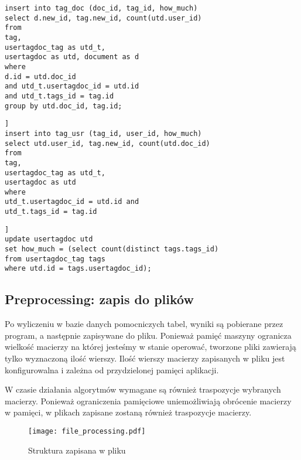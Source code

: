 \lstset{language=SQL}   
\begin{lstlisting}[frame=lines, caption={Skrypt dodający dane do tabeli tag\_doc}, label={sql_tag_doc}]
insert into tag_doc (doc_id, tag_id, how_much) 
select d.new_id, tag.new_id, count(utd.user_id)
from 
tag, 
usertagdoc_tag as utd_t,
usertagdoc as utd, document as d
where
d.id = utd.doc_id 
and utd_t.usertagdoc_id = utd.id 
and utd_t.tags_id = tag.id
group by utd.doc_id, tag.id;

\end{lstlisting}

\begin{lstlisting}[frame=lines, caption={Skrypt dodający dane do tabeli tag\_usr}, label={sql_tag_usr}]]
insert into tag_usr (tag_id, user_id, how_much)
select utd.user_id, tag.new_id, count(utd.doc_id)
from
tag,
usertagdoc_tag as utd_t,
usertagdoc as utd
where
utd_t.usertagdoc_id = utd.id and
utd_t.tags_id = tag.id
\end{lstlisting}

\begin{lstlisting}[frame=lines, caption={Skrypt updatujący pole how\_much w tabeli usertagdoc}, label={sql_usrtagdoc}] ]
update usertagdoc utd
set how_much = (select count(distinct tags.tags_id)
from usertagdoc_tag tags
where utd.id = tags.usertagdoc_id);
\end{lstlisting}


\subsection{Preprocessing: zapis do plików}
Po wyliczeniu w bazie danych pomocniczych tabel, wyniki są pobierane przez program, a następnie zapisywane do pliku. Ponieważ pamięć maszyny ogranicza wielkość macierzy na której jesteśmy w stanie operować, tworzone pliki zawierają tylko wyznaczoną ilość wierszy. Ilość wierszy macierzy zapisanych w pliku jest konfigurowalna i zależna od przydzielonej pamięci aplikacji.


W czasie działania algorytmów wymagane są również traspozycje wybranych macierzy. Ponieważ ograniczenia pamięciowe uniemożliwiają obrócenie macierzy w pamięci, w plikach zapisane zostaną również traspozycje macierzy.


\begin{figure}[htb]
\centering
\texttt{[image: file\_processing.pdf]}
\caption{Struktura zapisana w pliku}
\label{fig:preprocessing_fig}
\end{figure}

